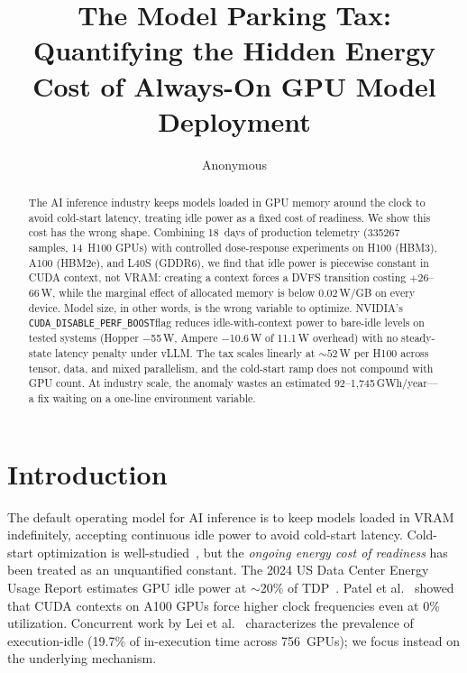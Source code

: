 \documentclass[sigconf,anonymous,review]{acmart}
\newcommand{\perfboost}{\texttt{CUDA\_\hspace{0pt}DISABLE\_\hspace{0pt}PERF\_\hspace{0pt}BOOST}}
\begin{document}
\title{The Model Parking Tax: Quantifying the Hidden Energy Cost of Always-On GPU Model Deployment}

\author{Anonymous}

\begin{abstract}
The AI inference industry keeps models loaded in GPU memory around the clock to avoid cold-start latency, treating idle power as a fixed cost of readiness. We show this cost has the wrong shape. Combining 18~days of production telemetry (\num{335267} samples, 14~H100 GPUs) with controlled dose-response experiments on H100 (HBM3), A100 (HBM2e), and L40S (GDDR6), we find that idle power is piecewise constant in CUDA context, not VRAM: creating a context forces a DVFS transition costing $+26$--$66$\,W, while the marginal effect of allocated memory is below $0.02$\,W/GB on every device. Model size, in other words, is the wrong variable to optimize. NVIDIA's \perfboost flag reduces idle-with-context power to bare-idle levels on tested systems (Hopper $-$55\,W, Ampere $-$10.6\,W of 11.1\,W overhead) with no steady-state latency penalty under vLLM. The tax scales linearly at ${\sim}52$\,W per H100 across tensor, data, and mixed parallelism, and the cold-start ramp does not compound with GPU count. At industry scale, the anomaly wastes an estimated 92--1{,}745\,GWh/year---a fix waiting on a one-line environment variable.
\end{abstract}


\maketitle

\section{Introduction}

The default operating model for AI inference is to keep models loaded in VRAM indefinitely, accepting continuous idle power to avoid cold-start latency. Cold-start optimization is well-studied~\cite{serverlessllm,nvidia-streamer,hydraserve,lambdascale}, but the \emph{ongoing energy cost of readiness} has been treated as an unquantified constant. The 2024 US Data Center Energy Usage Report estimates GPU idle power at $\sim$20\% of TDP~\cite{doe-report}. Patel et al.~\cite{patel-cal23} showed that CUDA contexts on A100 GPUs force higher clock frequencies even at 0\% utilization. Concurrent work by Lei et al.~\cite{lei-idle} characterizes the prevalence of execution-idle (19.7\% of in-execution time across 756~GPUs); we focus instead on the underlying mechanism.
\end{document}

